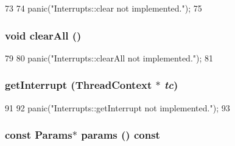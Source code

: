 \begin{DoxyCode}
73     {
74         panic("Interrupts::clear not implemented.\n");
75     }
\end{DoxyCode}
\hypertarget{classPowerISA_1_1Interrupts_a798729dca95209ecdc609807a653a2bf}{
\subsubsection[{clearAll}]{\setlength{\rightskip}{0pt plus 5cm}void clearAll ()}}
\label{classPowerISA_1_1Interrupts_a798729dca95209ecdc609807a653a2bf}



\begin{DoxyCode}
79     {
80         panic("Interrupts::clearAll not implemented.\n");
81     }
\end{DoxyCode}
\hypertarget{classPowerISA_1_1Interrupts_ae603c88d759977611d3bcc6e2deb61ae}{
\subsubsection[{getInterrupt}]{ getInterrupt ({\bf ThreadContext} $\ast$ {\em tc})}}
\label{classPowerISA_1_1Interrupts_ae603c88d759977611d3bcc6e2deb61ae}



\begin{DoxyCode}
91     {
92         panic("Interrupts::getInterrupt not implemented.\n");
93     }
\end{DoxyCode}
\hypertarget{classPowerISA_1_1Interrupts_acd3c3feb78ae7a8f88fe0f110a718dff}{
\subsubsection[{params}]{\setlength{\rightskip}{0pt plus 5cm}const {\bf Params}$\ast$ params () const}}
\label{classPowerISA_1_1Interrupts_acd3c3feb78ae7a8f88fe0f110a718dff}




